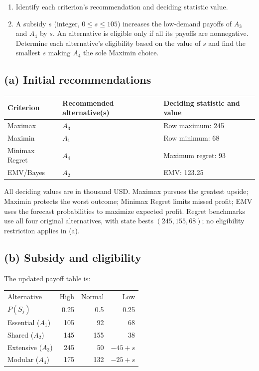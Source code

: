 \begin{enumerate}[label=\textbf{(\alph*)},leftmargin=*]
	\item Identify each criterion's recommendation and deciding statistic value. 

	\item A subsidy $s$ (integer, $0\leq s\leq105$) increases the low-demand payoffs of $A_3$ and $A_4$ by $s$. An alternative is eligible only if all its payoffs are nonnegative. Determine each alternative's eligibility based on the value of $s$ and find the smallest $s$ making $A_4$ the sole Maximin choice.
\end{enumerate}
\label{sol:q1a}
\subsection*{(a) Initial recommendations }
\begin{center}
\begin{tabular}{lll}\toprule
Criterion & Recommended alternative(s) & Deciding statistic and value\\ \midrule
		Maximax & $A_3$ & Row maximum: 245\\
		Maximin & $A_1$ & Row minimum: 68\\
		Minimax Regret & $A_4$ & Maximum regret: 93\\
		EMV/Bayes & $A_2$ & EMV: 123.25\\
		\bottomrule\end{tabular}
\end{center}
All deciding values are in thousand USD. Maximax pursues the greatest upside; Maximin protects the worst outcome; Minimax Regret limits missed profit; EMV uses the forecast probabilities to maximize expected profit. Regret benchmarks use all four original alternatives, with state bests $(245,155,68)$; no eligibility restriction applies in (a).
\secInicio[sec:q1]


\label{sol:q1b}
\subsection*{(b) Subsidy and eligibility }

The updated payoff table is:

\begin{center}\small\setlength{\tabcolsep}{4pt}
	\begin{tabular}{lrrr}\toprule
		Alternative & High & Normal & Low\\
		$P(S_j)$ & 0.25 & 0.5 & 0.25\\ \midrule
				Essential ($A_1$) & 105 & 92 & 68\\
		Shared ($A_2$) & 145 & 155 & 38\\
		Extensive ($A_3$) & 245 & 50 & $-45+s$\\
		Modular ($A_4$) & 175 & 132 & $-25+s$\\
		\bottomrule
	\end{tabular}
\end{center}

